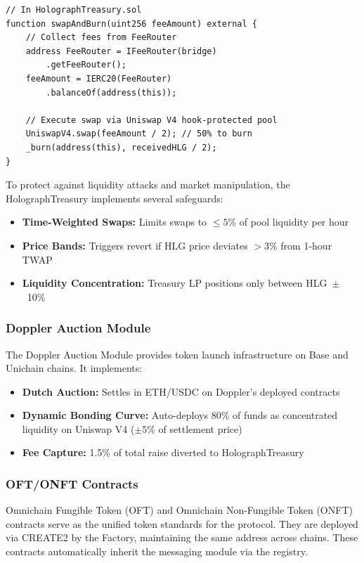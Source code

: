 \documentclass[10pt,a4paper,twocolumn]{article}
\begin{document}
\begin{lstlisting}[language=Solidity, caption=HolographTreasury.sol code snippet]
// In HolographTreasury.sol
function swapAndBurn(uint256 feeAmount) external {
    // Collect fees from FeeRouter
    address FeeRouter = IFeeRouter(bridge)
        .getFeeRouter();
    feeAmount = IERC20(FeeRouter)
        .balanceOf(address(this));
    
    // Execute swap via Uniswap V4 hook-protected pool
    UniswapV4.swap(feeAmount / 2); // 50% to burn
    _burn(address(this), receivedHLG / 2);
}
\end{lstlisting}

To protect against liquidity attacks and market manipulation, the HolographTreasury implements several safeguards:
\begin{itemize}
  \item \textbf{Time-Weighted Swaps:} Limits swaps to \(\le 5\%\) of pool liquidity per hour
  \item \textbf{Price Bands:} Triggers revert if HLG price deviates \(>3\%\) from 1-hour TWAP
  \item \textbf{Liquidity Concentration:} Treasury LP positions only between HLG~\(\pm\)~10\%
\end{itemize}

\subsubsection{Doppler Auction Module}
The Doppler Auction Module provides token launch infrastructure on Base and Unichain chains. It implements:
\begin{itemize}
  \item \textbf{Dutch Auction:} Settles in ETH/USDC on Doppler's deployed contracts
  \item \textbf{Dynamic Bonding Curve:} Auto-deploys 80\% of funds as concentrated liquidity on Uniswap V4 (\(\pm\)5\% of settlement price)
  \item \textbf{Fee Capture:} 1.5\% of total raise diverted to HolographTreasury
\end{itemize}

\subsubsection{OFT/ONFT Contracts}
Omnichain Fungible Token (OFT) and Omnichain Non-Fungible Token (ONFT) contracts serve as the unified token standards for the protocol. They are deployed via CREATE2 by the Factory, maintaining the same address across chains. These contracts automatically inherit the messaging module via the registry.
\end{document}
